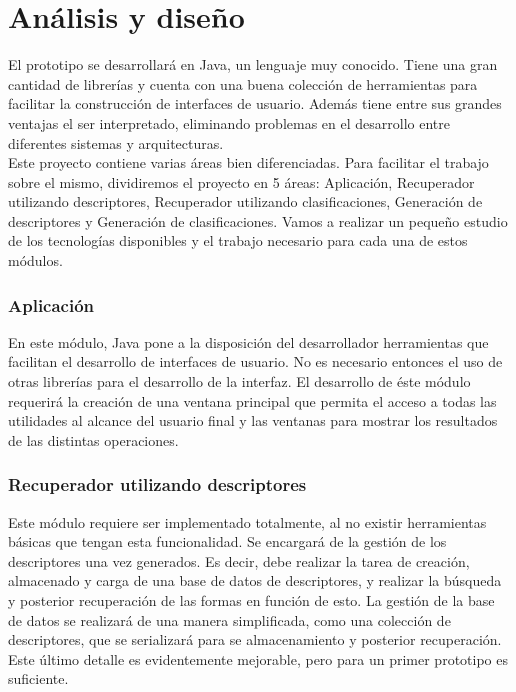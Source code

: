 \newpage
\section{Análisis y diseño}

El prototipo se desarrollará en Java, un lenguaje muy conocido. Tiene una gran cantidad de librerías y cuenta con una buena colección de herramientas para facilitar la construcción de interfaces de usuario. Además tiene entre sus grandes ventajas el ser interpretado, eliminando problemas en el desarrollo entre diferentes sistemas y arquitecturas.\\ 

Este proyecto contiene varias áreas bien diferenciadas. Para facilitar el trabajo sobre el mismo, dividiremos el proyecto en 5 áreas: Aplicación, Recuperador utilizando descriptores, Recuperador utilizando clasificaciones, Generación de descriptores y Generación de clasificaciones. Vamos a realizar un pequeño estudio de los tecnologías disponibles y el trabajo necesario para cada una de estos módulos.\\

\subsubsection{Aplicación}

En este módulo, Java pone a la disposición del desarrollador herramientas que facilitan el desarrollo de interfaces de usuario. No es necesario entonces el uso de otras librerías para el desarrollo de la interfaz. El desarrollo de éste módulo requerirá la creación de una ventana principal que permita el acceso a todas las utilidades al alcance del usuario final y las ventanas para mostrar los resultados de las distintas operaciones.\\

\subsubsection{Recuperador utilizando descriptores}

Este módulo requiere ser implementado totalmente, al no existir herramientas básicas que tengan esta funcionalidad. Se encargará de la gestión de los descriptores una vez generados. Es decir, debe realizar la tarea de creación, almacenado y carga de una base de datos de descriptores, y realizar la búsqueda y posterior recuperación de las formas en función de esto. La gestión de la base de datos se realizará de una manera simplificada, como una colección de descriptores, que se serializará para se almacenamiento y posterior recuperación. Este último detalle es evidentemente mejorable, pero para un primer prototipo es suficiente.\\


